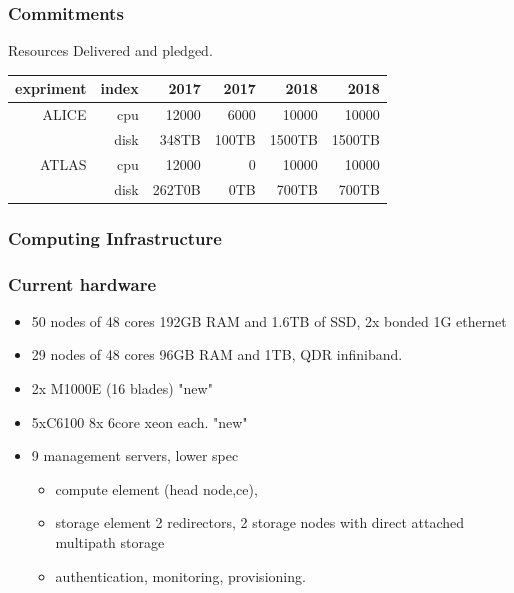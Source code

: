 \documentclass{beamer}
\begin{document}
\begin{frame}
\frametitle{Commitments}
Resources Delivered and pledged.
    \begin{tabular}{|r|r|r|r|r|r|}
        expriment&  index     & 2017  & 2017  & 2018   & 2018    \\ \hline
        ALICE         & cpu  & 12000  & 6000 & 10000  & 10000   \\ \hline
                 & disk & 348TB & 100TB & 1500TB & 1500TB \\ \hline
        ATLAS        & cpu  & 12000  & 0 & 10000  & 10000   \\ \hline
                 & disk & 262T0B & 0TB & 700TB & 700TB \\ \hline
    \end{tabular}
\end{frame}

\begin{frame}
  \frametitle{Computing Infrastructure}
\end{frame}

\begin{frame}
  \frametitle{Current hardware}
  \begin{itemize}
    \item 50 nodes of 48 cores 192GB RAM and 1.6TB of SSD, 2x bonded 1G ethernet
    \item 29 nodes of 48 cores 96GB RAM and 1TB, QDR infiniband.
    \item 2x M1000E (16 blades) "new"
    \item 5xC6100 8x 6core xeon each. "new" 
    \item 9 management servers, lower spec
  \begin{itemize}
    \item compute element (head node,ce),
    \item storage element 2 redirectors, 2 storage nodes with direct attached multipath storage
    \item authentication, monitoring, provisioning. 
  \end{itemize}
  \end{itemize}
\end{frame}
\end{document}
